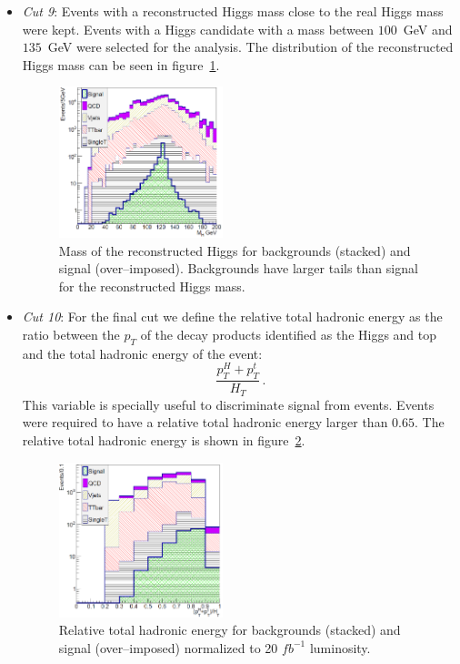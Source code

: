\begin{itemize}
\item \textit{Cut 9}: Events with a reconstructed Higgs mass close to the real Higgs mass were kept. Events with a Higgs candidate with a mass between $100$~GeV and $135$~GeV were selected for the analysis. The distribution of the reconstructed Higgs mass can be seen in figure~\ref{fig:Var4}.

\begin{figure}[!Hhtbp]
  \begin{center}
    \includegraphics[width=0.45\textwidth]{figs/Pheno/MH.png}
    \caption{Mass of the reconstructed Higgs for backgrounds (stacked) and signal (over--imposed). Backgrounds have larger tails than signal for the reconstructed Higgs mass.}
    \label{fig:Var4}
  \end{center}
\end{figure}

\item \textit{Cut 10}: For the final cut we define the relative total hadronic energy as the ratio between the $p_{T}$ of the decay products identified as the Higgs and top and the total hadronic energy of the event: $$\frac{p_{T}^{H}+p_{T}^{t}}{H_{T}}\,.$$ This variable is specially useful to discriminate signal from \ttbar events. Events were required to have a relative total hadronic energy larger than $0.65$. The relative total hadronic energy is shown in figure~\ref{fig:Var5}.

\begin{figure}[!Hhtbp]
  \begin{center}
    \includegraphics[width=0.45\textwidth]{figs/Pheno/RelHT.png}
    \caption{Relative total hadronic energy for backgrounds (stacked) and signal (over--imposed) normalized to 20 $fb^{-1}$ luminosity.}
    \label{fig:Var5}
  \end{center}
\end{figure}

\end{itemize}

